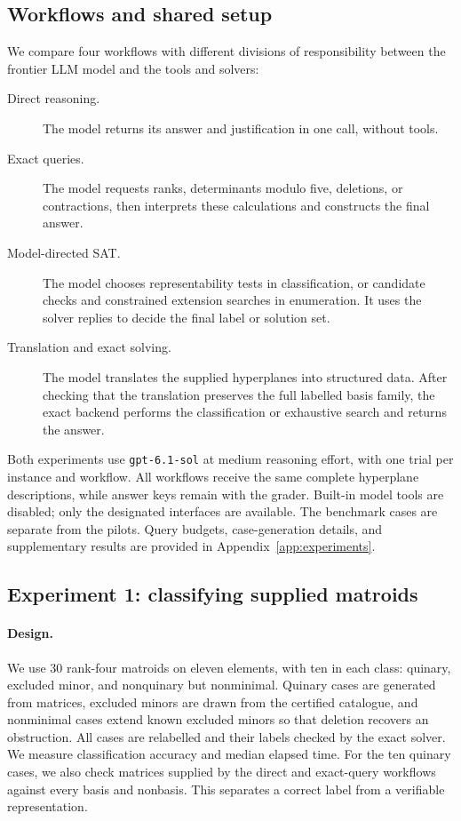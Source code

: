 \documentclass[11pt,letterpaper,titlepage]{article}
\begin{document}
\subsection{Workflows and shared setup}

We compare four workflows with different divisions of responsibility between the frontier LLM model and the tools and solvers:
\begin{description}
\item[Direct reasoning.] The model returns its answer and justification in one call, without tools.
\item[Exact queries.] The model requests ranks, determinants modulo five, deletions, or contractions, then interprets these calculations and constructs the final answer.
\item[Model-directed SAT.] The model chooses representability tests in classification, or candidate checks and constrained extension searches in enumeration. It uses the solver replies to decide the final label or solution set.
\item[Translation and exact solving.] The model translates the supplied hyperplanes into structured data. After checking that the translation preserves the full labelled basis family, the exact backend performs the classification or exhaustive search and returns the answer.
\end{description}

Both experiments use \texttt{gpt-6.1-sol} at medium reasoning effort, with one trial per instance and workflow. All workflows receive the same complete hyperplane descriptions, while answer keys remain with the grader. Built-in model tools are disabled; only the designated interfaces are available. The benchmark cases are separate from the pilots. Query budgets, case-generation details, and supplementary results are provided in Appendix~\ref{app:experiments}.

\subsection{Experiment 1: classifying supplied matroids}

\paragraph{Design.}
We use 30 rank-four matroids on eleven elements, with ten in each class: quinary, excluded minor, and nonquinary but nonminimal. Quinary cases are generated from matrices, excluded minors are drawn from the certified catalogue, and nonminimal cases extend known excluded minors so that deletion recovers an obstruction. All cases are relabelled and their labels checked by the exact solver. We measure classification accuracy and median elapsed time. For the ten quinary cases, we also check matrices supplied by the direct and exact-query workflows against every basis and nonbasis. This separates a correct label from a verifiable representation.
\end{document}
